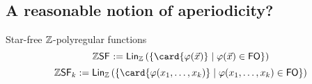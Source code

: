 \documentclass{beamer}
\begin{document}
\subsection{A reasonable notion of aperiodicity?}

\begin{frame}{Star-free $\mathbb{Z}$-polyregular functions}
    \begin{equation*}
        \Zsf \defined
        \Span{\setof{\card{\varphi(\vec{x})}}{\varphi(\vec{x}) \in \FO}}
    \end{equation*}
    \pause
    \begin{equation*}
        \Zsf[k] \defined
        \Span{\setof{\card{\varphi(x_1, \dots, x_k)}}{\varphi(x_1, \dots, x_k) \in \FO}}
    \end{equation*}
\end{frame}
\end{document}
